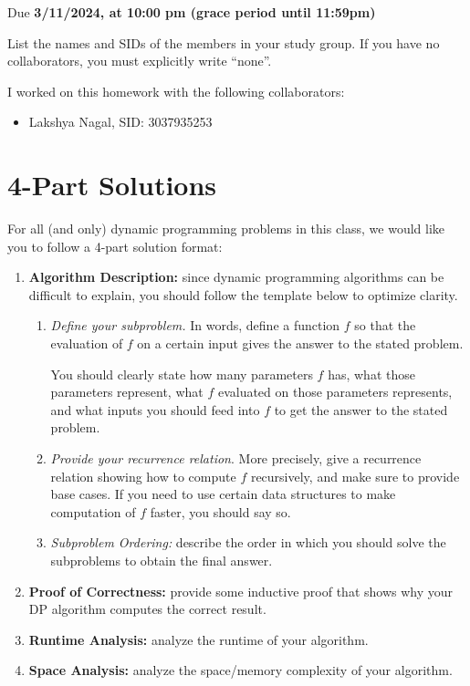 \documentclass[11pt]{article}
\def\duedate{3/11/2024, at 10:00 pm (grace period until 11:59pm)}
\begin{document}
\maketitle


Due \textbf{\duedate}

List the names and SIDs of the members in your study group.
If you have no collaborators, you must explicitly write ``none''.

\begin{solution} I worked on this homework with the following collaborators:
\begin{itemize}
    \item Lakshya Nagal, SID: 3037935253
\end{itemize}
\end{solution}

\section*{4-Part Solutions}

For all (and only) dynamic programming problems in this class, we would like you to follow a 4-part solution format:

\begin{enumerate}
    \item \textbf{Algorithm Description:} since dynamic programming algorithms can be difficult to explain, you should follow the template below to optimize clarity.
    \begin{enumerate}
        \item \textit{Define your subproblem.} In words, define a function $f$ so that the evaluation of $f$ on a certain input gives the answer to the stated problem.
        
        You should clearly state how many parameters $f$ has, what those parameters represent, what $f$ evaluated on those parameters represents, and what inputs you should feed into $f$ to get the answer to the stated problem.
        
        \item \textit{Provide your recurrence relation}. More precisely, give a recurrence relation showing how to compute $f$ recursively, and make sure to provide base cases. If you need to use certain data structures to make computation of $f$ faster, you should say so.
        
        \item \textit{Subproblem Ordering:} describe the order in which you should solve the subproblems to obtain the final answer.
    \end{enumerate}

    \item \textbf{Proof of Correctness:} provide some inductive proof that shows why your DP algorithm computes the correct result.

    \item \textbf{Runtime Analysis:} analyze the runtime of your algorithm.

    \item \textbf{Space Analysis:} analyze the space/memory complexity of your algorithm.
\end{enumerate}
\end{document}
